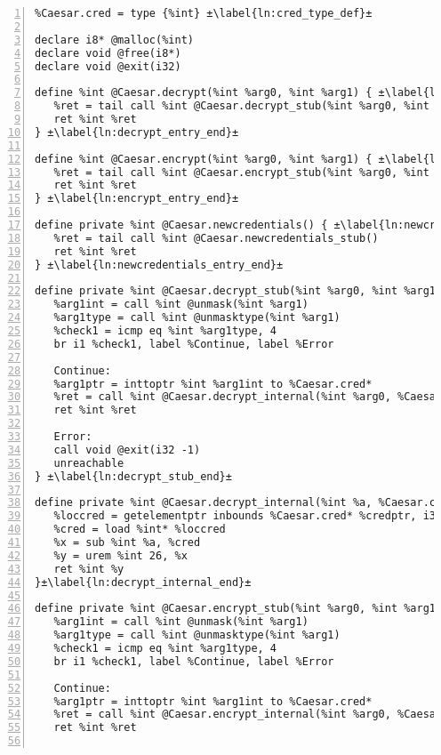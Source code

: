 \begin{lstlisting}[frame=single,numbers=left, language={[x86masm]Assembler}, caption={[LLVM Translation Caesar Cipher Example]LLVM IR for the example.},
label=llvm:Example]
%int = type i64
%Caesar.cred = type {%int} ±\label{ln:cred_type_def}±

declare i8* @malloc(%int)
declare void @free(i8*)
declare void @exit(i32)

define %int @Caesar.decrypt(%int %arg0, %int %arg1) { ±\label{ln:decrypt_entry_start}±
   %ret = tail call %int @Caesar.decrypt_stub(%int %arg0, %int %arg1)
   ret %int %ret
} ±\label{ln:decrypt_entry_end}±

define %int @Caesar.encrypt(%int %arg0, %int %arg1) { ±\label{ln:encrypt_entry_start}±
   %ret = tail call %int @Caesar.encrypt_stub(%int %arg0, %int %arg1)
   ret %int %ret
} ±\label{ln:encrypt_entry_end}±

define private %int @Caesar.newcredentials() { ±\label{ln:newcredentials_entry_start}±
   %ret = tail call %int @Caesar.newcredentials_stub()
   ret %int %ret
} ±\label{ln:newcredentials_entry_end}±

define private %int @Caesar.decrypt_stub(%int %arg0, %int %arg1) noinline { ±\label{ln:decrypt_stub_start}±
   %arg1int = call %int @unmask(%int %arg1)
   %arg1type = call %int @unmasktype(%int %arg1)
   %check1 = icmp eq %int %arg1type, 4
   br i1 %check1, label %Continue, label %Error
   
   Continue:
   %arg1ptr = inttoptr %int %arg1int to %Caesar.cred*
   %ret = call %int @Caesar.decrypt_internal(%int %arg0, %Caesar.cred* %arg1ptr)
   ret %int %ret
   
   Error:
   call void @exit(i32 -1)
   unreachable
} ±\label{ln:decrypt_stub_end}±

define private %int @Caesar.decrypt_internal(%int %a, %Caesar.cred* %credptr) { ±\label{ln:decrypt_internal_start}±
   %loccred = getelementptr inbounds %Caesar.cred* %credptr, i32 0, i32 0
   %cred = load %int* %loccred 
   %x = sub %int %a, %cred
   %y = urem %int 26, %x 
   ret %int %y
}±\label{ln:decrypt_internal_end}±

define private %int @Caesar.encrypt_stub(%int %arg0, %int %arg1) noinline { ±\label{ln:encrypt_stub_start}±
   %arg1int = call %int @unmask(%int %arg1)
   %arg1type = call %int @unmasktype(%int %arg1)
   %check1 = icmp eq %int %arg1type, 4
   br i1 %check1, label %Continue, label %Error
   
   Continue:
   %arg1ptr = inttoptr %int %arg1int to %Caesar.cred*
   %ret = call %int @Caesar.encrypt_internal(%int %arg0, %Caesar.cred* %arg1ptr)
   ret %int %ret
   

\end{lstlisting}
